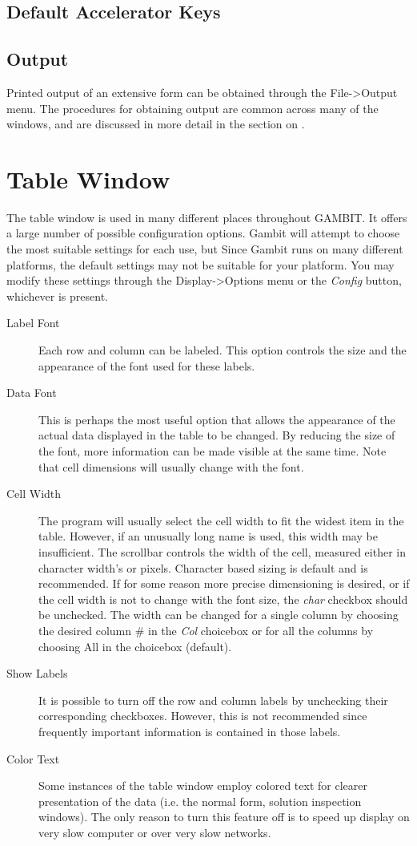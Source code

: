 \subsection{Default Accelerator Keys}\label{ExtFormDefAccl}

\subsection{Output} 
Printed output of an extensive form can be obtained through the File->Output 
menu.  The procedures for obtaining output are common across many of the 
windows, and are discussed in more detail in the section on 
. 

\section{Table Window}\label{TableWindow}
The table window is used in many different places throughout GAMBIT.  It 
offers a large number of possible configuration options.  Gambit 
will attempt to choose the most suitable settings for each use, but
Since Gambit runs on many different platforms, the default settings 
may not be suitable for your platform.  You may modify these settings 
through the Display->Options menu or the {\em Config} button, whichever is
present.

\begin{description}
\item[Label Font] Each row and column can be labeled.  This option controls
the size and the appearance of the font used for these labels.
\item[Data Font] This is perhaps the most useful option that allows the 
appearance of the actual data displayed in the table to be changed.  By
reducing the size of the font, more information can be made visible at the
same time.  Note that cell dimensions will usually change with the font.
\item[Cell Width] The program will usually select the cell width to fit the
widest item in the table.  However, if an unusually long name is used,
this width may be insufficient.  The scrollbar controls the width of the
cell, measured either in character width's or pixels.  Character based
sizing is default and is recommended.  If for some reason more precise
dimensioning is desired, or if the cell width is not to change with the
font size, the {\em char} checkbox should be unchecked.  The width can be
changed for a single column by choosing the desired column \# in the {\em
Col} choicebox or for all the columns by choosing All in the choicebox
(default).
\item[Show Labels] It is possible to turn off the row and column labels by 
unchecking their corresponding checkboxes.  However, this is not
recommended since frequently important information is contained in those
labels.
\item[Color Text] Some instances of the table window employ colored text 
for clearer presentation of the data (i.e. the normal form, solution
inspection windows).  The only reason to turn this feature off is to speed
up display on very slow computer or over very slow networks.
\end{description}


